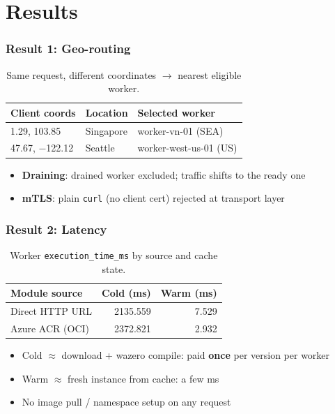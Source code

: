 \documentclass[11pt, aspectratio=169]{beamer}
\begin{document}
\section{Results}

\begin{frame}
	\frametitle{Result 1: Geo-routing}
	\begin{table}
		\centering
		\begin{tabular}{|l|l|l|}
			\hline
			\textbf{Client coords} & \textbf{Location} & \textbf{Selected worker}\\
			\hline
			1.29, 103.85 & Singapore & worker-vn-01 (SEA) \\
			\hline
			47.67, $-$122.12 & Seattle & worker-west-us-01 (US) \\
			\hline
		\end{tabular}
		\caption{Same request, different coordinates $\rightarrow$ nearest eligible worker.}
	\end{table}
	\begin{itemize}
		\item \textbf{Draining}: drained worker excluded; traffic shifts to the ready one
		\item \textbf{mTLS}: plain \texttt{curl} (no client cert) rejected at transport layer
	\end{itemize}
\end{frame}

\begin{frame}
	\frametitle{Result 2: Latency}
	\begin{table}
		\centering
		\begin{tabular}{|l|r|r|}
			\hline
			\textbf{Module source} & \textbf{Cold (ms)} & \textbf{Warm (ms)}\\
			\hline
			Direct HTTP URL & 2135.559 & 7.529 \\
			\hline
			Azure ACR (OCI) & 2372.821 & 2.932 \\
			\hline
		\end{tabular}
		\caption{Worker \texttt{execution\_time\_ms} by source and cache state.}
	\end{table}
	\begin{itemize}
		\item Cold $\approx$ download + wazero compile: paid \textbf{once} per version per worker
		\item Warm $\approx$ fresh instance from cache: a few ms
		\item No image pull / namespace setup on any request
	\end{itemize}
\end{frame}
\end{document}
